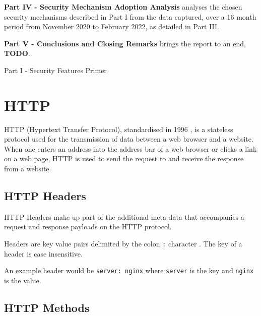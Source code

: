 \documentclass{mscreport}
\begin{document}
\vspace{0.3cm} \noindent
\textbf{Part IV - Security Mechanism Adoption Analysis} analyses the chosen security mechanisms described in Part I from the data captured, over a 16 month period from November 2020 to February 2022, as detailed in Part III.

\vspace{0.3cm} \noindent
\textbf{Part V - Conclusions and Closing Remarks} brings the report to an end, \textbf{TODO}.

\newpage

\vspace*{\fill}
\begin{center}
\begin{huge}
Part I - Security Features Primer
\end{huge}
\end{center}
\vspace{\fill}

\newpage

\section{HTTP}
\label{section:http}

HTTP (Hypertext Transfer Protocol), standardised in 1996 \cite{Berners-Lee1996-ji}, is a stateless protocol used for the transmission of data between a web browser and a website. When one enters an address into the address bar of a web browser or clicks a link on a web page, HTTP is used to send the request to and receive the response from a website.

\subsection{HTTP Headers}

\noindent HTTP Headers make up part of the additional meta-data that accompanies a request and response payloads on the HTTP protocol.

\vspace{0.3cm} \noindent
Headers are key value pairs delimited by the colon \texttt{:} character \cite{Berners-Lee1996-ji}. The key of a header is case insensitive.

\vspace{0.3cm} \noindent
An example header would be \texttt{server: nginx} where \texttt{server} is the key and \texttt{nginx} is the value.

\subsection{HTTP Methods}
\end{document}
